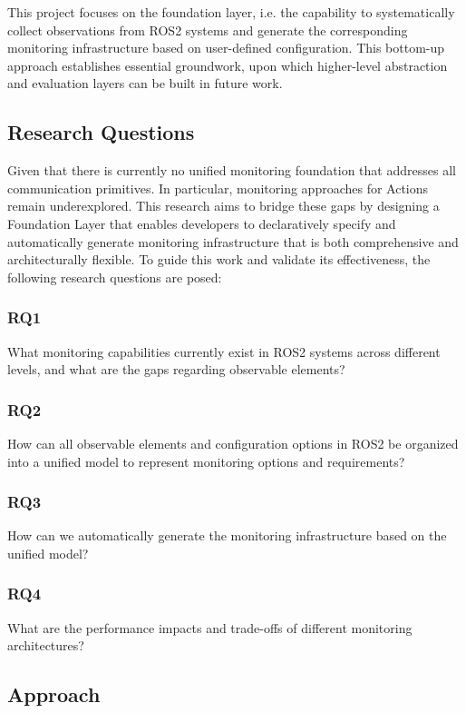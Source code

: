 This project focuses on the foundation layer, i.e. the capability to systematically collect observations from ROS2 systems and generate the corresponding monitoring infrastructure based on user-defined configuration. This bottom-up approach establishes essential groundwork, upon which higher-level abstraction and evaluation layers can be built in future work.

\subsection{Research Questions}
Given that there is currently no unified monitoring foundation that addresses all communication primitives. In particular, monitoring approaches for Actions remain underexplored. This research aims to bridge these gaps by designing a Foundation Layer that enables developers to declaratively specify and automatically generate monitoring infrastructure that is both comprehensive and architecturally flexible. To guide this work and validate its effectiveness, the following research questions are posed:

\subsubsection{RQ1}
What monitoring capabilities currently exist in ROS2 systems across different levels, and what are the gaps regarding observable elements?

\subsubsection{RQ2}
How can all observable elements and configuration options in ROS2 be organized into a unified model to represent monitoring options and requirements?

\subsubsection{RQ3}
How can we automatically generate the monitoring infrastructure based on the unified model?

\subsubsection{RQ4}
What are the performance impacts and trade-offs of different monitoring architectures?

\subsection{Approach}

